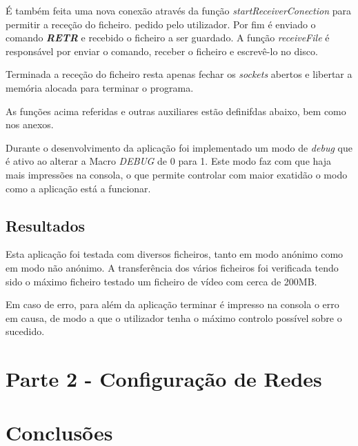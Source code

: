 \documentclass[a4paper]{article}
\begin{document}
	 É também feita uma nova conexão através da função \textit{startReceiverConection} para permitir a receção do ficheiro. pedido pelo utilizador. Por fim é enviado o comando \textbf{\textit{RETR}} e recebido o ficheiro a ser guardado. A função \textit{receiveFile} é responsável por enviar o comando, receber o ficheiro e escrevê-lo no disco.

	Terminada a receção do ficheiro resta apenas fechar os \textit{sockets} abertos e libertar a memória alocada para terminar o programa.

	As funções acima referidas e outras auxiliares estão definifdas abaixo, bem como nos anexos.

	
	\normalsize
	
	Durante o desenvolvimento da aplicação foi implementado um modo de \textit{debug} que é ativo ao alterar a Macro \textit{DEBUG} de 0 para 1. Este modo faz com que haja mais impressões na consola, o que permite controlar com maior exatidão o modo como a aplicação está a funcionar.

	
	\normalsize

	\subsection{Resultados}

	Esta aplicação foi testada com diversos ficheiros, tanto em modo anónimo como em modo não anónimo. A transferência dos vários ficheiros foi verificada tendo sido o máximo ficheiro testado um ficheiro de vídeo com cerca de 200MB.

	Em caso de erro, para além da aplicação terminar é impresso na consola o erro em causa, de modo a que o utilizador tenha o máximo controlo possível sobre o sucedido.

	\section{Parte 2 - Configuração de Redes}

	\clearpage

	\section{Conclusões}
\end{document}
